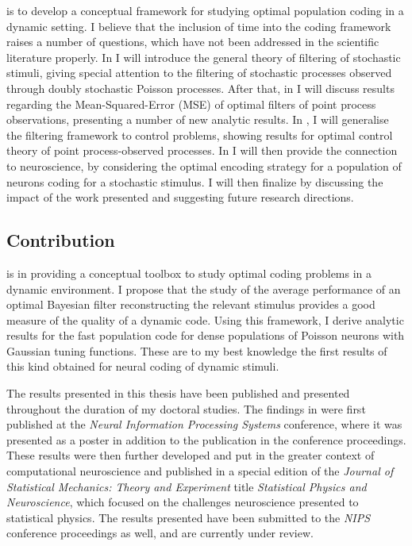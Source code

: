  is to develop a conceptual framework for studying optimal population coding in a dynamic setting. 
I believe that the 
inclusion of time into the coding framework raises a number of questions, which have not been addressed in the scientific literature properly. In   I will introduce the general theory of filtering of stochastic stimuli, giving special attention to the filtering of stochastic processes 
observed through doubly stochastic Poisson processes. After that, in  I will discuss results regarding the 
Mean-Squared-Error (MSE) of optimal filters of point process observations, presenting a number of new analytic results. In , I will generalise the 
filtering 
framework to control problems, showing results for optimal control theory of point process-observed processes. In  I will then provide the connection 
to neuroscience, by considering the optimal encoding strategy for a population of neurons coding for a stochastic stimulus. I will then finalize by discussing the impact 
of the work presented and suggesting future research directions.\par

\subsection*{Contribution}

 is in providing a conceptual toolbox to study optimal coding problems in a dynamic environment. I propose that the 
study of the average performance of an optimal Bayesian filter reconstructing the relevant stimulus provides a good measure of the quality of a dynamic code. Using 
this framework, I derive analytic results for the fast population code for dense populations of Poisson neurons with Gaussian tuning functions. These are to my best knowledge the first results of this kind obtained for neural coding of dynamic stimuli.\par

The results presented in this thesis have been published and presented throughout the duration of my doctoral studies. The findings in  were first
published at the \emph{Neural Information Processing Systems} conference, where it was presented as a poster in addition to the publication in the conference 
proceedings. These results were then further developed and put in the greater context of computational neuroscience and published in a special
edition of the \emph{Journal of Statistical Mechanics: Theory and Experiment} title \emph{Statistical Physics and Neuroscience}, which focused on the challenges 
neuroscience presented to statistical physics. The results presented  have been submitted to the \emph{NIPS} conference
proceedings as well, and are currently under review.\par

